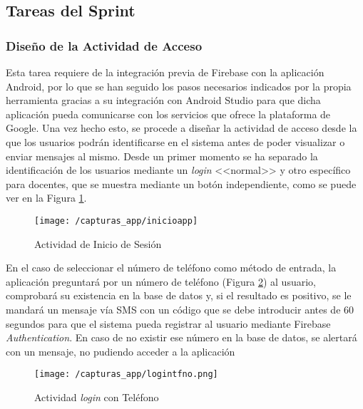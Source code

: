 \newpage

\subsection{Tareas del Sprint}
\subsubsection{Diseño de la Actividad de Acceso}
Esta tarea requiere de la integración previa de Firebase con la aplicación Android, por lo que se han seguido los pasos necesarios indicados por la propia herramienta gracias a su integración con Android Studio para que dicha aplicación pueda comunicarse con los servicios que ofrece la plataforma de Google. Una vez hecho esto, se procede a diseñar la actividad de acceso desde la que los usuarios podrán identificarse en el sistema antes de poder visualizar o enviar mensajes al mismo. Desde un primer momento se ha separado la identificación de los usuarios mediante un \textit{login} <<normal>> y otro específico para docentes, que se muestra mediante un botón independiente, como se puede ver en la Figura \ref{fig:login1}.

\begin{figure}[!h]
	\begin{center}
		\texttt{[image: /capturas\_app/inicioapp]}
		\caption{Actividad de Inicio de Sesión}
		\label{fig:login1}
	\end{center}
\end{figure}

\newpage

En el caso de seleccionar el número de teléfono como método de entrada, la aplicación preguntará por un número de teléfono (Figura \ref{fig:logintfno}) al usuario, comprobará su existencia en la base de datos y, si el resultado es positivo, se le mandará un mensaje vía \acs{SMS} con un código que se debe introducir antes de 60 segundos para que el sistema pueda registrar al usuario mediante Firebase \textit{Authentication}. En caso de no existir ese número en la base de datos, se alertará con un mensaje, no pudiendo acceder a la aplicación

\begin{figure}[!h]
	\begin{center}
		\texttt{[image: /capturas\_app/logintfno.png]}
		\caption{Actividad \textit{login} con Teléfono}
		\label{fig:logintfno}
	\end{center}
\end{figure}

